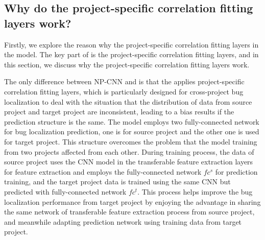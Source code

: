 \subsection{Why do the project-specific correlation fitting layers work? }
Firstly, we explore the reason why the project-specific correlation fitting layers in the \TRANPCNN model. The key part of \TRANPCNN is the project-specific correlation fitting layers, and in this section, we discuss why the project-specific correlation fitting layers work. 

The only difference between NP-CNN and \TRANPCNN is that the \TRANPCNN applies project-specific correlation fitting layers, which is particularly designed for cross-project bug localization to deal with the situation that the distribution of data from source project and target project are inconsistent, leading to a bias results if the prediction structure is the same. The \TRANPCNN model employs two fully-connected network for bug localization prediction, one is for source project and the other one is used for target project. This structure overcomes the problem that the model training from two projects affected from each other. During training process, the data of source project uses the CNN model in the transferable feature extraction layers  for feature extraction and employs the fully-connected network $fc^s$ for prediction training, and the target project data is trained using the same CNN but predicted with fully-connected network $fc^t$. This process helps improve the bug localization performance from target project by enjoying the advantage in sharing the same network of transferable feature extraction process from source project, and meanwhile adapting prediction network using training data from target project. 

